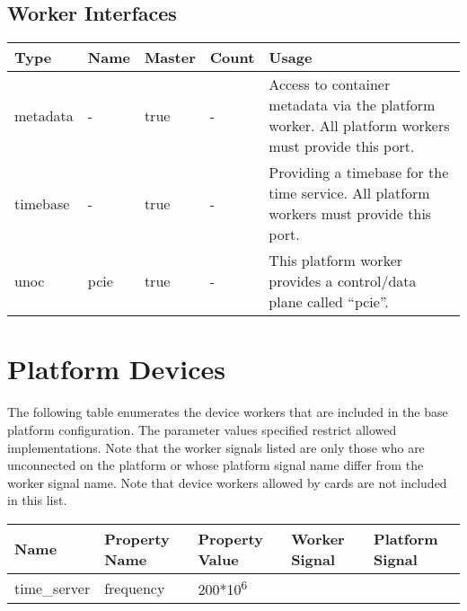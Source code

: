 \begin{landscape}
	\section*{Worker Interfaces}
	\begin{scriptsize}
		\begin{tabular}{|M{2cm}|M{2cm}|M{1.5cm}|M{1.5cm}|M{14.5cm}|}
			\hline
			Type       & Name & Master & Count & Usage                  \\
			\hline
			metadata   & -    & true   & -     & Access to container metadata via the platform worker. All platform workers must provide this port. \\
			\hline
			timebase   & -    & true   & -     & Providing a timebase for the time service. All platform workers must provide this port. \\
			\hline
			unoc       & pcie & true   & -     & This platform worker provides a control/data plane called ``pcie''. \\
			\hline
		\end{tabular}
	\end{scriptsize}

\end{landscape}
\pagebreak

\section*{Platform Devices}
The following table enumerates the device workers that are included in the base platform configuration. The parameter values specified restrict allowed implementations. Note that the worker signals listed are only those who are unconnected on the platform or whose platform signal name differ from the worker signal name. Note that device workers allowed by cards are not included in this list. \\ \newline
\begin{tabular}{|M{3cm}|M{3.5cm}|M{3cm}|M{3cm}|M{3cm}|}
	\hline
	Name                       & Property Name    & Property Value              & Worker Signal & Platform Signal         \\
	\hline
	time\_server               & frequency        & 200*10\textsuperscript{6}   &               &                         \\
	\hline
\end{tabular}

